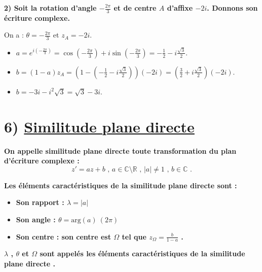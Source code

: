 \documentclass[12pt,a4paper]{article}
\begin{document}
\textbf{2) Soit la rotation d'angle \(-\frac{2\pi}{3}\) et de centre \(A\) d'affixe \(-2i\). Donnons son écriture complexe.}

On a : \(\theta = -\frac{2\pi}{3}\) et \(z_A = -2i\).
\begin{itemize}
    \item \(a = e^{i(-\frac{2\pi}{3})} = \cos(-\frac{2\pi}{3}) + i\sin(-\frac{2\pi}{3}) = -\frac{1}{2} - i\frac{\sqrt{3}}{2}\).
    \item \(b = (1 - a) z_A = \left(1 - (-\frac{1}{2} - i\frac{\sqrt{3}}{2})\right)(-2i) = \left(\frac{3}{2} + i\frac{\sqrt{3}}{2}\right)(-2i)\).
    \item \(b = -3i - i^2\sqrt{3} = \sqrt{3} - 3i\).
\end{itemize}

\begin{center}
\end{center}
\section*{6) \underline{Similitude plane directe}}

\textbf{On appelle similitude plane directe toute transformation du plan d'écriture complexe :}
\[ z' = az + b \text{ , } a \in \mathbb{C} \setminus \mathbb{R} \text{ , } |a| \neq 1 \text{ , } b \in \mathbb{C} \text{ .} \]

\textbf{Les éléments caractéristiques de la similitude plane directe sont :}
\begin{itemize}
    \item[$\blacktriangleright$] \textbf{Son rapport : $\lambda = |a|$}
    \item[$\blacktriangleright$] \textbf{Son angle : $\theta = \text{arg}(a) \ (2\pi)$}
\end{itemize}

\begin{itemize}
    \item[$\blacktriangleright$] \textbf{Son centre : son centre est $\Omega$ tel que $z_{\Omega} = \frac{b}{1 - a}$ .}
\end{itemize}

\textbf{$\lambda$ , $\theta$ et $\Omega$ sont appelés les éléments caractéristiques de la similitude plane directe .}
\end{document}
